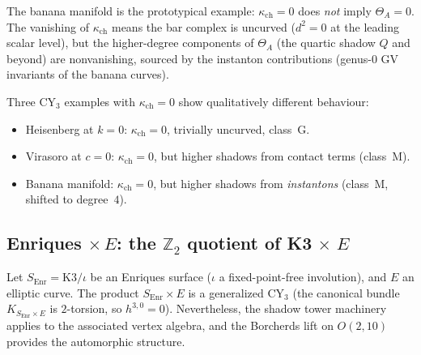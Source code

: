 \begin{remark}[\texorpdfstring{$\kappa_{\mathrm{ch}} = 0$}{kappa-ch = 0} does not imply \texorpdfstring{$\Theta_A = 0$}{Theta-A = 0}]
\label{rem:banana-ap31}
The banana manifold is the prototypical example: $\kappa_{\mathrm{ch}} = 0$ does \emph{not} imply $\Theta_A = 0$. The vanishing of $\kappa_{\mathrm{ch}}$ means the bar complex is uncurved ($d^2 = 0$ at the leading scalar level), but the higher-degree components of $\Theta_A$ (the quartic shadow $Q$ and beyond) are nonvanishing, sourced by the instanton contributions (genus-$0$ GV invariants of the banana curves).

Three CY$_3$ examples with $\kappa_{\mathrm{ch}} = 0$ show qualitatively different behaviour:
\begin{itemize}
 \item Heisenberg at $k = 0$: $\kappa_{\mathrm{ch}} = 0$, trivially uncurved, class~G.
 \item Virasoro at $c = 0$: $\kappa_{\mathrm{ch}} = 0$, but higher shadows from contact terms (class~M).
 \item Banana manifold: $\kappa_{\mathrm{ch}} = 0$, but higher shadows from \emph{instantons} (class~M, shifted to degree~$4$).
\end{itemize}
\end{remark}


\subsection{Enriques \texorpdfstring{$\times\, E$}{x E}: the \texorpdfstring{$\mathbb{Z}_2$}{Z-2} quotient of K3\texorpdfstring{$\,\times\, E$}{x E}}
\label{subsec:enriques-times-e}

Let $S_{\mathrm{Enr}} = \mathrm{K3} / \iota$ be an Enriques surface ($\iota$ a fixed-point-free involution), and $E$ an elliptic curve. The product $S_{\mathrm{Enr}} \times E$ is a generalized CY$_3$ (the canonical bundle $K_{S_{\mathrm{Enr}} \times E}$ is $2$-torsion, so $h^{3,0} = 0$). Nevertheless, the shadow tower machinery applies to the associated vertex algebra, and the Borcherds lift on $O(2,10)$ provides the automorphic structure.

